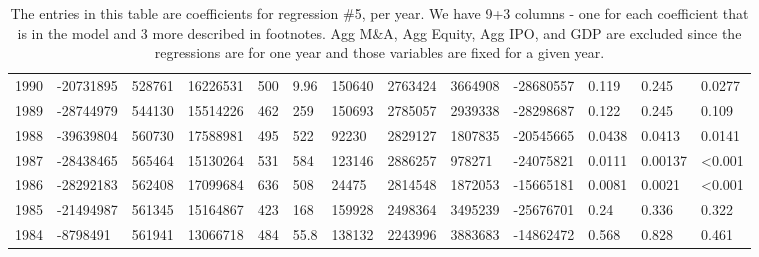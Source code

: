 \documentclass{article}
\begin{document}
\begin{table}[H]
\begin{tabular}{rllllllllllll}
  1990 & -20731895 & 528761 & 16226531 & 500 & 9.96 & 150640 & 2763424 & 3664908 & -28680557 & 0.119 & 0.245 & 0.0277 \\
  1989 & -28744979 & 544130 & 15514226 & 462 & 259 & 150693 & 2785057 & 2939338 & -28298687 & 0.122 & 0.245 & 0.109 \\
  1988 & -39639804 & 560730 & 17588981 & 495 & 522 & 92230 & 2829127 & 1807835 & -20545665 & 0.0438 & 0.0413 & 0.0141 \\
  1987 & -28438465 & 565464 & 15130264 & 531 & 584 & 123146 & 2886257 & 978271 & -24075821 & 0.0111 & 0.00137 & \textless 0.001 \\
  1986 & -28292183 & 562408 & 17099684 & 636 & 508 & 24475 & 2814548 & 1872053 & -15665181 & 0.0081 & 0.0021 & \textless 0.001 \\
  1985 & -21494987 & 561345 & 15164867 & 423 & 168 & 159928 & 2498364 & 3495239 & -25676701 & 0.24 & 0.336 & 0.322 \\
  1984 & -8798491 & 561941 & 13066718 & 484 & 55.8 & 138132 & 2243996 & 3883683 & -14862472 & 0.568 & 0.828 & 0.461 \\
   \hline
\end{tabular}
\caption{The entries in this table are coefficients for regression \#5, per year.
                  We have 9+3 columns - one for each coefficient that is in the model and 3 more described in footnotes.
                  Agg M\&A, Agg Equity, Agg IPO, and GDP are excluded since the regressions are for one year and those
                  variables are fixed for a given year.}
\end{table}
\end{document}
